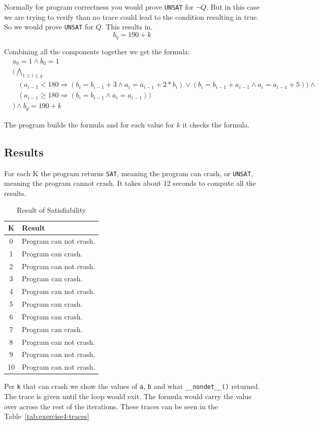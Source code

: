 Normally for program correctness you would prove \texttt{UNSAT} for $\neg Q$.
But in this case we are trying to verify than no trace could lead to the condition resulting in true.
So we would prove \texttt{UNSAT} for $Q$. This results in.
\[
b_q = 190 + k
\]

Combining all the components together we get the formula:
\begin{equation}
\begin{split}
	& a_0 = 1 \wedge b_0 = 1 \\
	& \bigg(\bigwedge_{1 \le i \le q}  \\
		& \quad \big( \  a_{i-1} < 180 \Rightarrow 
			( b_i = b_{i-1} + 3 \wedge a_i = a_{i-1} + 2 * b_i ) \vee
			( b_i = b_{i-1} + a_{i-1} \wedge a_i = a_{i-1} + 5 )
		\big) \wedge \\ 
		& \quad \big( \ a_{i-1} \geq 180 \Rightarrow 
			( b_i = b_{i-1} \wedge a_i = a_{i-1} )
		\big) \\
	& \bigg) \wedge b_q = 190 + k
\end{split}
\end{equation}

The program builds the formula and for each value for $k$ it checks the formula.

\subsection{Results}
For each K the program returns \texttt{SAT}, meaning the program can crash, or \texttt{UNSAT}, meaning the program cannot crash. It takes about 12 seconds to compute all the results.
\begin{table}[H]
\centering
\caption{Result of Satisfiability}
\label{tab:exercise4}
\begin{tabular}{c|l}
	\textbf{K} & \textbf{Result} \\
    \hline
	0  & Program can not crash.  \\
	1  & Program can crash.  \\
	2  & Program can not crash.  \\
	3  & Program can crash.  \\
	4  & Program can not crash.  \\
	5  & Program can crash.  \\
	6  & Program can crash.  \\
	7  & Program can crash.  \\
	8  & Program can not crash.  \\
	9  & Program can not crash.  \\
	10 & Program can not crash.  \\
\end{tabular}
\end{table}
Per \texttt{k} that can crash we show the values of \texttt{a}, \texttt{b}  and what \verb|__nondet__()| returned.
The trace is given until the loop would exit.
The formula would carry the value over across the rest of the iterations. These traces can be seen in the Table~\ref{tab:exercise4-traces}


